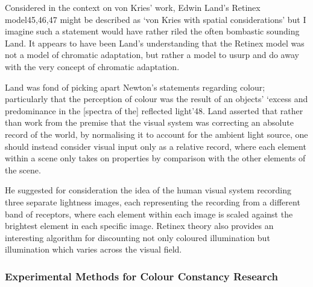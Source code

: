 Considered in the context on von Kries' work, Edwin Land's Retinex model45,46,47 might be described as `von Kries with spatial considerations' but I imagine such a statement would have rather riled the often bombastic sounding Land. It appears to have been Land's understanding that the Retinex model was not a model of chromatic adaptation, but rather a model to usurp and do away with the very concept of chromatic adaptation.

Land was fond of picking apart Newton's statements regarding colour; particularly that the perception of colour was the result of an objects' `excess and predominance in the [spectra of the] reflected light'48. Land asserted that rather than work from the premise that the visual system was correcting an absolute record of the world, by normalising it to account for the ambient light source, one should instead consider visual input only as a relative record, where each element within a scene only takes on properties by comparison with the other elements of the scene. 

He suggested for consideration the idea of the human visual system recording three separate lightness images, each representing the recording from a different band of receptors, where each element within each image is scaled against the brightest element in each specific image. Retinex theory also provides an interesting algorithm for discounting not only coloured illumination but illumination which varies across the visual field.


\subsubsection{Experimental Methods for Colour Constancy Research}

